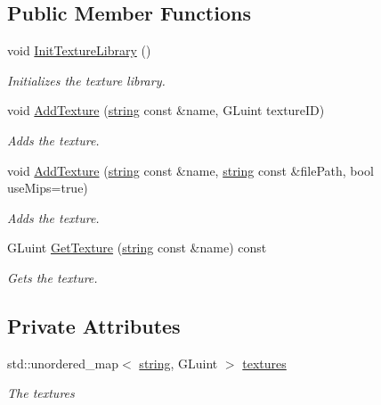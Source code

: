\subsection*{Public Member Functions}
\begin{DoxyCompactItemize}
\item 
void \hyperlink{class_texture_library_aa38b13b8e73a1ccf70ab360d4827810d}{Init\+Texture\+Library} ()
\begin{DoxyCompactList}\small\item\em Initializes the texture library. \end{DoxyCompactList}\item 
void \hyperlink{class_texture_library_a16501654a4ee4179f37cc2a6d21381ff}{Add\+Texture} (\hyperlink{_types_8h_ad453f9f71ce1f9153fb748d6bb25e454}{string} const \&name, G\+Luint texture\+ID)
\begin{DoxyCompactList}\small\item\em Adds the texture. \end{DoxyCompactList}\item 
void \hyperlink{class_texture_library_a434b47448628dc791c5295a9fa070786}{Add\+Texture} (\hyperlink{_types_8h_ad453f9f71ce1f9153fb748d6bb25e454}{string} const \&name, \hyperlink{_types_8h_ad453f9f71ce1f9153fb748d6bb25e454}{string} const \&file\+Path, bool use\+Mips=true)
\begin{DoxyCompactList}\small\item\em Adds the texture. \end{DoxyCompactList}\item 
G\+Luint \hyperlink{class_texture_library_ac71f2a92ec8d4fe4c889ad6c43796863}{Get\+Texture} (\hyperlink{_types_8h_ad453f9f71ce1f9153fb748d6bb25e454}{string} const \&name) const 
\begin{DoxyCompactList}\small\item\em Gets the texture. \end{DoxyCompactList}\end{DoxyCompactItemize}
\subsection*{Private Attributes}
\begin{DoxyCompactItemize}
\item 
std\+::unordered\+\_\+map$<$ \hyperlink{_types_8h_ad453f9f71ce1f9153fb748d6bb25e454}{string}, G\+Luint $>$ \hyperlink{class_texture_library_a9410551a89d1b90cb86453da44dbd704}{textures}
\begin{DoxyCompactList}\small\item\em The textures \end{DoxyCompactList}\end{DoxyCompactItemize}
